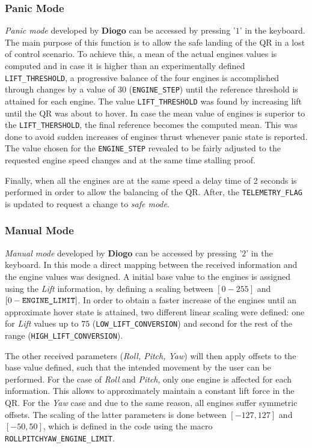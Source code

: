 \documentclass{article}
\begin{document}
\subsubsection{Panic Mode}
\textit{Panic mode} developed by \textbf{Diogo} can be accessed by pressing '$1$' in the keyboard. The main purpose of this function is to allow the safe landing of the QR in a lost of control scenario. To achieve this, a mean of the actual engines values is computed and in case it is higher than an experimentally defined \texttt{LIFT\_THRESHOLD}, a progressive balance of the four engines is accomplished through changes by a value of $30$ (\texttt{ENGINE\_STEP}) until the reference threshold is attained for each engine. The value \texttt{LIFT\_THRESHOLD} was found by increasing lift until the QR was about to hover.  In case the mean value of engines is superior to the \texttt{LIFT\_THERSHOLD}, the final reference becomes the computed mean. This was done to avoid sudden increases of engines thrust whenever panic state is reported. The value chosen for the \texttt{ENGINE\_STEP} revealed to be fairly adjusted to the requested engine speed changes and at the same time stalling proof.

Finally, when all the engines are at the same speed a delay time of 2 seconds is performed in order to allow the balancing of the QR. After, the \texttt{TELEMETRY\_FLAG} is updated to request a change to \textit{safe mode}.

\subsubsection{Manual Mode}
\textit{Manual mode} developed by \textbf{Diogo} can be accessed by pressing '$2$' in the keyboard. In this mode a direct mapping between the received information and the engine values was designed. A initial base value to the engines is assigned using the \textit{Lift} information, by defining a scaling between $[0-255]$ and $[0-\text{\texttt{ENGINE\_LIMIT}}]$. In order to obtain a faster increase of the engines until an approximate hover state is attained, two different linear scaling were defined: one for \textit{Lift} values up to $75$ (\texttt{LOW\_LIFT\_CONVERSION}) and second for the rest of the range (\texttt{HIGH\_LIFT\_CONVERSION}).

The other received parameters (\textit{Roll, Pitch, Yaw}) will then apply offsets to the base value defined, such that the intended movement by the user can be performed. For the case of \textit{Roll} and \textit{Pitch}, only one engine is affected for each information. This allows to approximately maintain a constant lift force in the QR. For the \textit{Yaw} case and due to the same reason, all engines suffer symmetric offsets. The scaling of the latter parameters is done between $[-127,127]$ and $[-50,50]$, which is defined in the code using the macro \texttt{ROLLPITCHYAW\_ENGINE\_LIMIT}. 
\end{document}
